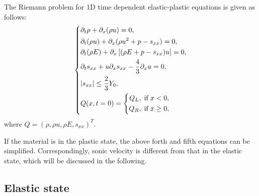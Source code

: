 \documentclass{article}
\numberwithin{equation}{section}
\numberwithin{table}{section}
\begin{document}
The Riemann problem for 1D time dependent elastic-plastic equations is given as follows:
 \begin{equation}\label{eq:1d}
   \left\{ \begin{aligned}
       & \partial _t \rho +\partial_x(\rho u)=0,\\
       & \partial _t (\rho u)+\partial_x(\rho u^2 + p -s_{xx})=0,\\
       &\partial _t (\rho E)+\partial_x\left[(\rho E + p -s_{xx})u\right]=0,\\
       &\partial _t s_{xx}+u\partial_xs_{xx}-\frac{4}{3}\partial_x u=0,\\
& |s_{xx}|\leq \frac{2}{3}Y_{0}, \\
       &Q(x,t = 0) = \left\{\begin{aligned}
           Q_L, \hspace{0.1cm} \text{if} \hspace{0.1cm} x<0, \\
           Q_R, \hspace{0.1cm} \text{if} \hspace{0.1cm} x\ge 0, \\
       \end{aligned}\right.
     \end{aligned}
  \right.
\end{equation}
where $Q = (\rho, \rho u, \rho E, s_{xx})^T$.



\textcolor[rgb]{0.00,0.00,1.00}{If the material is in the plastic state, the above forth and fifth equations can be simplified. Correspondingly, sonic velocity is different from that in the elastic state, 
which will be discussed in the following.}

\subsection{Elastic state}
\end{document}
